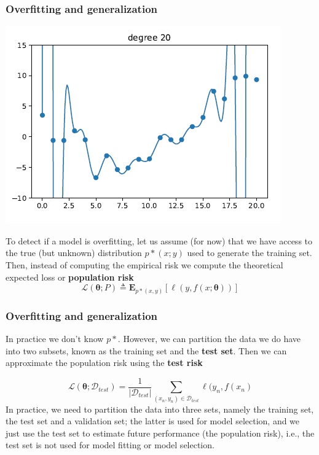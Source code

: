 \documentclass[spanish]{beamer}
\begin{document}
\begin{frame}
\frametitle{Overfitting and generalization}

\begin{center}
\includegraphics[scale=0.4]{im14}
\end{center}
To detect if a model is overfitting, let us assume (for now) that we have access to the true (but
unknown) distribution $p*(x; y)$ used to generate the training set. Then, instead of computing the
empirical risk we compute the theoretical expected loss or \textbf{population risk}
\begin{equation}
\mathcal{L}(\boldsymbol{\theta} ;P) \triangleq \mathbf{E}_{p*(x,y)}[\ell(y,f(x;\boldsymbol{\theta} ))]
\end{equation}

\end{frame}
\begin{frame}
\frametitle{Overfitting and generalization}
In practice we don’t know $p*$. However, we can partition the data we do have into two subsets,
known as the training set and the \textbf{test set}. Then we can approximate the population risk using the
\textbf{test risk}

\begin{equation*}
\mathcal{L}(\mathbf{\theta}; \mathcal{D}_{test})= \frac{1}{\vert \mathcal{D}_{test} \vert }  \sum_{(x_n,y_n)\in \mathcal{D}_{test}  } \ell (y_{n}, f(x_{n}) 
\end{equation*}
In practice, we need to partition the data into three sets, namely the training set, the test set and
a validation set; the latter is used for model selection, and we just use the test set to estimate
future performance (the population risk), i.e., the test set is not used for model fitting or model
selection.

\end{frame}
\end{document}
